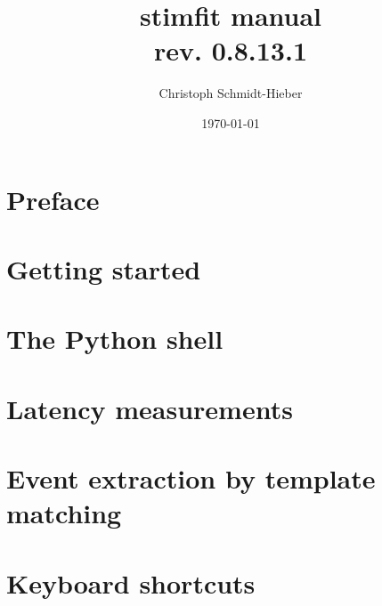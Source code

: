 \documentclass[a4paper,11pt,normalheadings,idxtotoc,bibtotoc,headsepline]{scrbook} %
\title{stimfit manual\\\normalsize rev. 0.8.13.1}
\author{Christoph Schmidt-Hieber}
\date{\today}
\begin{document}
\pagestyle{scrheadings}

\frontmatter

\maketitle

\tableofcontents

\chapter{Preface}



\mainmatter

\chapter{Getting started}



\chapter{The Python shell}



\chapter{Latency measurements}



\chapter{Event extraction by template matching}



\backmatter

\chapter{Keyboard shortcuts}





\footnotesize
\printindex
\normalsize
\end{document}
